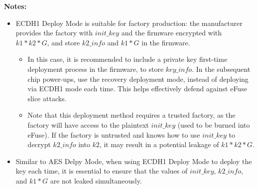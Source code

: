 \documentclass[main\_\_EN.tex]{subfiles}
\begin{document}
\textbf{Notes:}\\
\begin{itemize}

    \item ECDH1 Deploy Mode is suitable for factory production: the manufacturer provides the factory with \begin{math}init\_key\end{math} and the firmware encrypted with \begin{math}k1*k2*G\end{math}, and store \begin{math}k2\_info\end{math} and \begin{math}k1*G\end{math} in the firmware.
    \begin{itemize}
        \item In this case, it is recommended to include a private key first-time deployment process in the firmware, to store \hyperref[para:keyinfo]{\begin{math}key\_info\end{math}}. In the subsequent chip power-ups, use the recovery deployment mode, instead of deploying via ECDH1 mode each time. This helps effectively defend against eFuse slice attacks.
        \item Note that this deployment method requires a trusted factory, as the factory will have access to the plaintext \begin{math}init\_key\end{math} (used to be burned into eFuse). If the factory is untrusted and knows how to use \begin{math}init\_key\end{math} to decrypt \begin{math}k2\_info\end{math} into \begin{math}k2\end{math}, it may result in a potential leakage of \begin{math}k1*k2*G\end{math}.
    \end{itemize}
    \item Similar to AES Delpy Mode, when using ECDH1 Deploy Mode to deploy the key each time, it is essential to ensure that the values of \begin{math}init\_key\end{math}, \begin{math}k2\_info\end{math}, and \begin{math}k1*G\end{math} are not leaked simultaneously.

\end{itemize}
\end{document}

